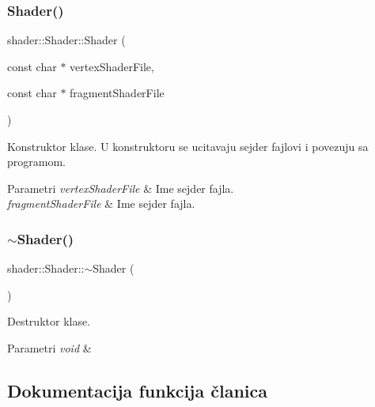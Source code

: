 \subsubsection{\texorpdfstring{Shader()}{Shader()}}
{\footnotesize\ttfamily shader\+::\+Shader\+::\+Shader (\begin{DoxyParamCaption}\item[{const char $\ast$}]{vertex\+Shader\+File,  }\item[{const char $\ast$}]{fragment\+Shader\+File }\end{DoxyParamCaption})}



Konstruktor klase. U konstruktoru se ucitavaju sejder fajlovi i povezuju sa programom. 


\begin{DoxyParams}{Parametri}
{\em vertex\+Shader\+File} & Ime sejder fajla. \\
\hline
{\em fragment\+Shader\+File} & Ime sejder fajla. \\
\hline
\end{DoxyParams}
\mbox{\label{classshader_1_1Shader_a8d9b3ffe1ba804f91a26bd79a7588a34}} 
\subsubsection{\texorpdfstring{$\sim$\+Shader()}{~Shader()}}
{\footnotesize\ttfamily shader\+::\+Shader\+::$\sim$\+Shader (\begin{DoxyParamCaption}{ }\end{DoxyParamCaption})}



Destruktor klase. 


\begin{DoxyParams}{Parametri}
{\em void} & \\
\hline
\end{DoxyParams}


\subsection{Dokumentacija funkcija članica}
\mbox{\label{classshader_1_1Shader_a879993e6f90506d6c9c0b9a39d1caebb}} 
